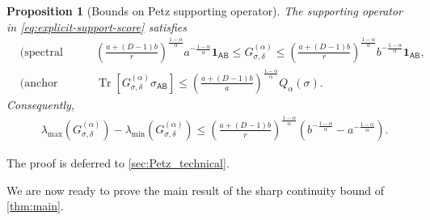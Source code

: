 \documentclass[11pt,reqno]{amsart}
\newtheorem{proposition}[proposition]{Proposition}
\theoremstyle{definition}
\DeclareMathOperator{\Tr}{Tr}
\newcommand{\I}{\mathbf 1}
\newcommand{\A}{\mathsf{A}}
\newcommand{\B}{\mathsf{B}}
\begin{document}
\begin{proposition}[Bounds on Petz supporting operator]
\label{prop:score-calibration}
The supporting operator in \cref{eq:explicit-support-score} satisfies
\begin{align}
 &\text{(spectral bounds)}
 &&\left(\frac{a+(D-1)b}{r}\right)^{\frac{1-\alpha}{\alpha}}
 a^{-\frac{1-\alpha}{\alpha}}\I_{\A\B}
 \leq G_{\sigma,\delta}^{(\alpha)}
 \leq
 \left(\frac{a+(D-1)b}{r}\right)^{\frac{1-\alpha}{\alpha}}
 b^{-\frac{1-\alpha}{\alpha}}\I_{\A\B},
 \label{eq:explicit-score-interval}
\\
&\text{(anchor calibration)}
&&\Tr\!\left[G_{\sigma,\delta}^{(\alpha)}\sigma_{\A\B}\right]
\leq
 \left(\frac{a+(D-1)b}{a}\right)^{\frac{1-\alpha}{\alpha}}
 Q_\alpha(\sigma). \label{eq:anchor-calibration}
\end{align}
Consequently,
\begin{align}
 &\lambda_{\max}\!\left(G_{\sigma,\delta}^{(\alpha)}\right)
 -\lambda_{\min}\!\left(G_{\sigma,\delta}^{(\alpha)}\right)
 \leq
 \left(\frac{a+(D-1)b}{r}\right)^{\frac{1-\alpha}{\alpha}}
 \left(b^{-\frac{1-\alpha}{\alpha}}-a^{-\frac{1-\alpha}{\alpha}}\right).
 \label{eq:explicit-score-diameter}
\end{align}
\end{proposition}
\noindent The proof is deferred to \cref{sec:Petz_technical}.


\medskip
We are now ready to prove the main result of the sharp continuity bound of \cref{thm:main}.
\end{document}
